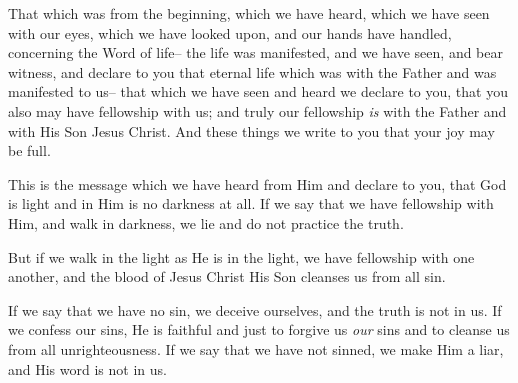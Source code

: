 
\bverse That which was from the beginning, which we have heard, which we have seen with our eyes, which we have looked upon, and our hands have handled, concerning the Word of life--
\bverse the life was manifested, and we have seen, and bear witness, and declare to you that eternal life which was with the Father and was manifested to us--
\bverse that which we have seen and heard we declare to you, that you also may have fellowship with us; and truly our fellowship \textit{is} with the Father and with His Son Jesus Christ.
\bverse And these things we write to you that your joy may be full.


\bverse This is the message which we have heard from Him and declare to you, that God is light and in Him is no darkness at all.
\bverse If we say that we have fellowship with Him, and walk in darkness, we lie and do not practice the truth.

\bverse But if we walk in the light as He is in the light, we have fellowship with one another, and the blood of Jesus Christ His Son cleanses us from all sin.

\bverse If we say that we have no sin, we deceive ourselves, and the truth is not in us.
\bverse If we confess our sins, He is faithful and just to forgive us \textit{our} sins and to cleanse us from all unrighteousness.
\bverse If we say that we have not sinned, we make Him a liar, and His word is not in us.


